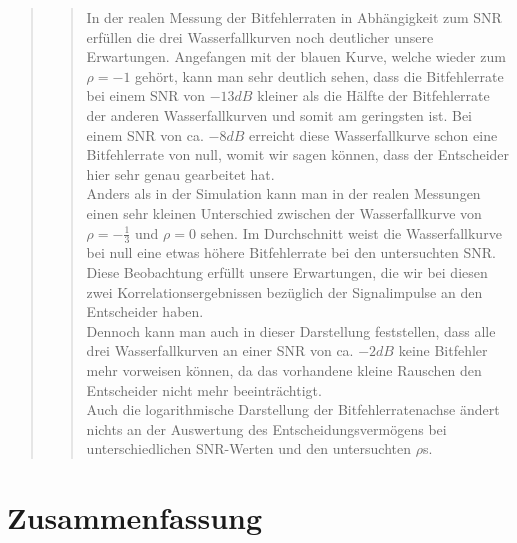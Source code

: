 \begin{quote}
\begin{quote}
                \vspace{2em}
        
        In der realen Messung der Bitfehlerraten in Abhängigkeit zum SNR
        erfüllen die drei Wasserfallkurven noch deutlicher unsere Erwartungen.
        Angefangen mit der blauen Kurve, welche wieder zum $\rho = -1$ gehört,
        kann man sehr deutlich sehen, dass die Bitfehlerrate bei einem
        SNR von $-13 dB$ kleiner als die Hälfte der Bitfehlerrate der anderen
        Wasserfallkurven und somit am geringsten ist. Bei einem SNR von ca. $-8
        dB$ erreicht diese Wasserfallkurve schon eine Bitfehlerrate von null,
        womit wir sagen können, dass der Entscheider hier sehr genau gearbeitet
        hat.\\ 
        Anders als in der Simulation kann man in der realen Messungen einen sehr
        kleinen Unterschied zwischen der Wasserfallkurve von $\rho =
        -\frac{1}{3}$ und $\rho = 0$ sehen. Im Durchschnitt weist die
        Wasserfallkurve bei null eine etwas höhere Bitfehlerrate bei den
        untersuchten SNR. Diese Beobachtung erfüllt unsere Erwartungen, die wir
        bei diesen zwei Korrelationsergebnissen bezüglich der Signalimpulse an den 
        Entscheider haben.\\
        Dennoch kann man auch in dieser Darstellung feststellen, dass alle drei
        Wasserfallkurven an einer SNR von ca. $-2 dB$ keine Bitfehler mehr
        vorweisen können, da das vorhandene kleine Rauschen den Entscheider
        nicht mehr beeinträchtigt.\\
        
        Auch die logarithmische Darstellung der Bitfehlerratenachse ändert
        nichts an der Auswertung des Entscheidungsvermögens bei
        unterschiedlichen SNR-Werten und den untersuchten $\rho$s.
        
        
        
    \end{quote}  %
            
\end{quote}%

    
\section{Zusammenfassung}
\begin{quote}

    
\end{quote}%
         

